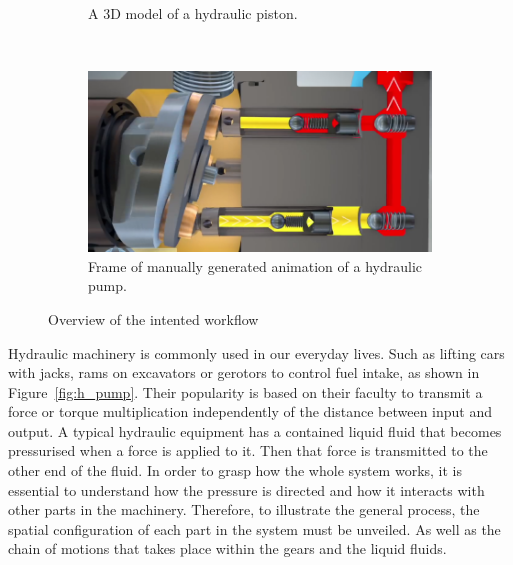 \documentclass[11pt]{report}
\begin{document}
\begin{figure}
\begin{subfigure}[b]{0.3\textwidth}
                \caption{A 3D model of a hydraulic piston.}
                \label{fig:pistonModel}
        \end{subfigure}
        ~ %
        \begin{subfigure}[b]{0.3\textwidth}
                \includegraphics[width=\textwidth]{images/cylinder_animation}
                \caption{Frame of manually generated animation of a hydraulic pump.}
                \label{fig:cylinder_animation}
        \end{subfigure}
        \caption{Overview of the intented workflow}\label{fig:AnimOverview}
\end{figure}

Hydraulic machinery is commonly used in our everyday lives.
Such as lifting cars with jacks, rams on excavators or gerotors to control fuel intake, as shown in Figure~\ref{fig:h_pump}.
Their popularity is based on their faculty to transmit a force or torque multiplication independently of the distance between input and output.  
A typical hydraulic equipment has a contained liquid fluid that becomes pressurised when a force is applied to it.
Then that force is transmitted to the other end of the fluid. 
In order to grasp how the whole system works, it is essential to understand how the pressure is directed and how it interacts with other parts in the machinery. 
Therefore, to illustrate the general process, the spatial configuration of each part in the system must be unveiled.
As well as the chain of motions that takes place within the gears and the liquid fluids.\\
\end{document}
